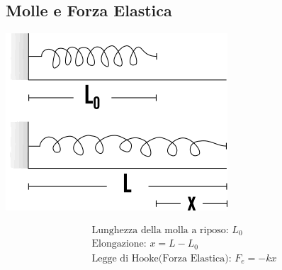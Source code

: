 \subsection{Molle e Forza Elastica}
\begin{center}
\includegraphics[width=0.4 \linewidth]{Dinamica/forza-elastica.png} 
\end{center}
\begin{gather*}
    \text{Lunghezza della molla a riposo: } L_0 \\
    \text{Elongazione: } x = L - L_0 \\
    \text{Legge di Hooke(Forza Elastica): } F_e = -k x
\end{gather*}